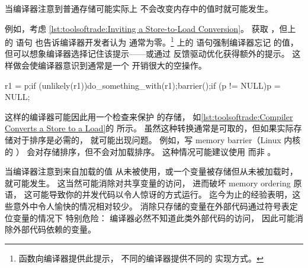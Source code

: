 \begin{description}[labelsep=.4em]
\item[存储转加载转换（Store-to-load conversion）] 当编译器注意到普通存储可能实际上
不会改变内存中的值时就可能发生。
\begin{fcvref}
例如，考虑
\cref{lst:toolsoftrade:Inviting a Store-to-Load Conversion}。
获取 ，但上的  语句
也告诉编译器开发者认为  通常为零。\footnote{
	 函数向编译器提供此提示，
	不同的编译器提供不同的  实现方式。}
上的  语句强制编译器忘记
 的值，但可以想象编译器选择记住该提示——或通过
反馈驱动优化获得额外的提示。
这样做会使编译器意识到通常是一个
开销很大的空操作。
\end{fcvref}

\begin{listing}
\begin{fcvlabel}
\begin{VerbatimLL}[commandchars=\\\[\]]
r1 = p;\lnlbl[load:p]
if (unlikely(r1))\lnlbl[if]
	do_something_with(r1);\lnlbl[dsw]
barrier();\lnlbl[barrier]
if (p != NULL)\lnlbl[if1]
	p = NULL;\lnlbl[null]
\end{VerbatimLL}
\end{fcvlabel}
\caption{编译器将存储转换为加载}
\label{lst:toolsoftrade:Compiler Converts a Store to a Load}
\end{listing}

\begin{fcvref}
这样的编译器可能因此用一个检查来保护  的存储，
如\cref{lst:toolsoftrade:Compiler Converts a Store to a Load}的
所示。
虽然这种转换通常是可取的，但如果实际存储对于排序是必需的，
就可能出现问题。
例如，写 memory barrier（Linux 内核的 ）
会对存储排序，但不会对加载排序。
这种情况可能建议使用 
而非 。
\end{fcvref}

\item[死代码消除（Dead-code elimination）] 当编译器注意到来自加载的值
从未被使用，或一个变量被存储但从未被加载时，就可能发生。
这当然可能消除对共享变量的访问，
进而破坏 memory ordering 原语，
这可能导致你的并发代码以令人惊讶的方式运行。
迄今为止的经验表明，这些意外中令人愉快的情况相对较少。
消除只存储的变量在外部代码通过符号表定位变量的情况下
特别危险：
编译器必然不知道此类外部代码的访问，
因此可能消除外部代码依赖的变量。

\end{description}


